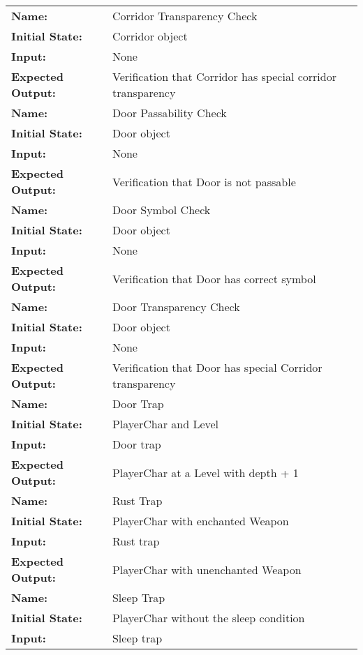 \documentclass[12pt, titlepage]{article}
\begin{document}
\begin{center}
\begin{longtable}{ l | p{10cm} }
				\hline
				\rule{0pt}{1.5em}\textbf{Name:} & Corridor Transparency Check\\
				\textbf{Initial State:} & Corridor object\\
				\textbf{Input:} & None\\
				\textbf{Expected Output:} & Verification that Corridor has special corridor transparency\\[0.6em]
				\hline
				\rule{0pt}{1.5em}\textbf{Name:} & Door Passability Check\\
				\textbf{Initial State:} & Door object\\
				\textbf{Input:} & None\\
				\textbf{Expected Output:} & Verification that Door is not passable\\[0.6em]
				\hline
				\rule{0pt}{1.5em}\textbf{Name:} & Door Symbol Check\\
				\textbf{Initial State:} & Door object\\
				\textbf{Input:} & None\\
				\textbf{Expected Output:} & Verification that Door has correct symbol\\[0.6em]
				\hline
				\rule{0pt}{1.5em}\textbf{Name:} & Door Transparency Check\\
				\textbf{Initial State:} & Door object\\
				\textbf{Input:} & None\\
				\textbf{Expected Output:} & Verification that Door has special Corridor transparency\\[0.6em]
				\hline
				\rule{0pt}{1.5em}\textbf{Name:} & Door Trap\\
				\textbf{Initial State:} & PlayerChar and Level\\
				\textbf{Input:} & Door trap\\
				\textbf{Expected Output:} & PlayerChar at a Level with depth + 1\\[0.6em]
				\hline
				\rule{0pt}{1.5em}\textbf{Name:} & Rust Trap\\
				\textbf{Initial State:} & PlayerChar with enchanted Weapon\\
				\textbf{Input:} & Rust trap\\
				\textbf{Expected Output:} & PlayerChar with unenchanted Weapon\\[0.6em]
				\hline
				\rule{0pt}{1.5em}\textbf{Name:} & Sleep Trap\\
				\textbf{Initial State:} & PlayerChar without the sleep condition\\
				\textbf{Input:} & Sleep trap\\

\end{longtable}
\end{center}
\end{document}
